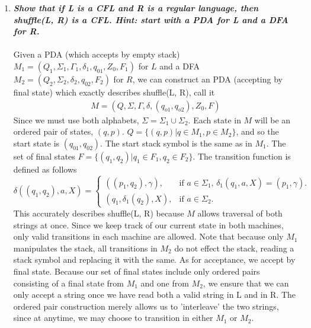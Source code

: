 \documentclass[a4paper]{article}
\begin{document}
\begin{enumerate}
\begin{enumerate}[1.]
\item \textbf{\emph{Show that if L is a CFL and R is a regular language, then shuffle(L, R) is a CFL. Hint: start with a PDA for L and a DFA for R.}} \\
\\
Given a PDA (which accepts by empty stack) $M_1 = (Q_1, \Sigma_1, \Gamma_1, \delta_1, q_{01}, Z_{0}, F_1)$ for $L$ and a DFA $M_2 = (Q_2, \Sigma_2, \delta_2, q_{02}, F_2)$ for $R$, we can construct an PDA (accepting by final state) which exactly describes shuffle(L, R), call it 
\begin{align*}
M = (Q, \Sigma, \Gamma, \delta, (q_{o1},q_{o2}), Z_0, F)
\end{align*}
Since we must use both alphabets, $\Sigma = \Sigma_1 \cup \Sigma_2$. Each state in $M$ will be an ordered pair of states, $(q, p)$. $Q = \{(q, p)| q \in M_1, p \in M_2\}$, and so the start state is $(q_{01},q_{02})$. The start stack symbol is the same as in $M_1$. The set of final states $F = \{(q_1, q_2)|q_1 \in F_1, q_2 \in F_2\}$. The transition function is defined as follows
\begin{equation*}
  \delta((q_1, q_2), a, X) =\begin{cases}
    ((p_1, q_2), \gamma), & \text{if $a \in \Sigma_1$, $\delta_1(q_1, a, X) = (p_1, \gamma)$}.\\
    (q_1, \delta_1(q_2), X), & \text{if $a \in \Sigma_2$}.
  \end{cases}
\end{equation*}
This accurately describes shuffle(L, R) because $M$ allows traversal of both strings at once. Since we keep track of our current state in both machines, only valid transitions in each machine are allowed. Note that because only $M_1$ manipulates the stack, all transitions in $M_2$ do not effect the stack, reading a stack symbol and replacing it with the same. As for acceptance, we accept by final state. Because our set of final states include only ordered pairs consisting of a final state from $M_1$ and one from $M_2$, we ensure that we can only accept a string once we have read both a valid string in L and in R. The ordered pair construction merely allows us to 'interleave' the two strings, since at anytime, we may choose to transition in either $M_1$ or $M_2$. \\




\end{enumerate}
\end{enumerate}
\end{document}
